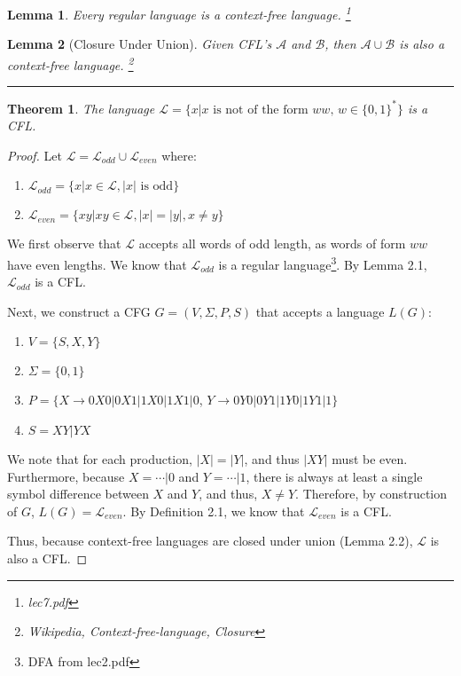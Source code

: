 \documentclass[11pt]{report}
\newcounter{problem}
\theoremstyle{definition}
\theoremstyle{plain}
\newtheorem{lemma}{Lemma}[problem]
\theoremstyle{plain}
\newtheorem{theorem*}{Theorem}
\begin{document}
\begin{lemma}
Every regular language is a context-free language. \footnote{lec7.pdf}
\end{lemma}

\begin{lemma} [Closure Under Union]
Given CFL's $\mathcal{A}$ and $\mathcal{B}$, then $\mathcal{A} \cup \mathcal{B}$ is also a context-free language.
\footnote{Wikipedia, Context-free-language, Closure}
\end{lemma}
\hrule

\begin{theorem*}
The language $\mathcal{L}=\{ x| x \text{ is not of the form } ww \text{, } w \in \{0,1\}^{*} \}$ is a CFL.
\end{theorem*}

\begin{proof}
Let $\mathcal{L}=\mathcal{L}_{odd} \cup \mathcal{L}_{even}$ where:
\begin{enumerate}
\item $\mathcal{L}_{odd} = \{ x | x \in \mathcal{L}, |x| \text{ is odd} \}$
\item $\mathcal{L}_{even} = \{ xy | xy \in \mathcal{L}, |x| = |y|, x \neq y \}$
\end{enumerate}

\noindent We first observe that $\mathcal{L}$ accepts all words of odd length, as words of form $ww$ have even lengths.
We know that $\mathcal{L}_{odd}$ is a regular language\footnote{DFA from lec2.pdf}. 
By Lemma 2.1, $\mathcal{L}_{odd}$ is a CFL. \newline

\noindent Next, we construct a CFG $G=(V,\Sigma,P,S)$ that accepts a language $L(G)$:

\begin{enumerate}
\item $V=\{S,X,Y\}$
\item $\Sigma = \{0,1\}$
\item $P = \{X \longrightarrow 0X0|0X1|1X0|1X1|0$, $Y \longrightarrow 0Y0|0Y1|1Y0|1Y1|1\}$
\item $S = XY|YX$
\end{enumerate}

\noindent We note that for each production, $|X| = |Y|$, and thus $|XY|$ must be even.
Furthermore, because $X= \cdots|0$ and $Y= \cdots|1$, 
there is always at least a single symbol difference between $X$ and $Y$, and thus, $X \neq Y$.
Therefore, by construction of $G$, $L(G)=\mathcal{L}_{even}$. 
By Definition 2.1, we know that $\mathcal{L}_{even}$ is a CFL. \newline

\noindent Thus, because context-free languages are closed under union (Lemma 2.2), $\mathcal{L}$ is also a CFL.

\noindent 
\pagebreak
\end{proof}
\end{document}
